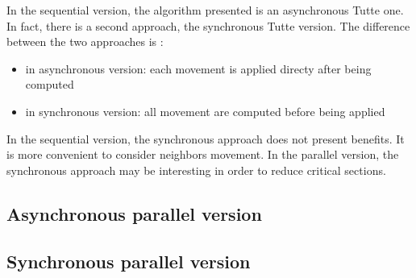

In the sequential version, the algorithm presented is an asynchronous Tutte one. In fact, there is a second approach, the synchronous Tutte version. The difference between the two approaches is :
\begin{itemize}
\item in asynchronous version: each movement is applied directy after being computed
\item in synchronous version: all movement are computed before being applied
\end{itemize}
In the sequential version, the synchronous approach does not present benefits. It is more convenient to consider neighbors movement.
In the parallel version, the synchronous approach may be interesting in order to reduce critical sections.

\subsection{Asynchronous parallel version}


\subsection{Synchronous parallel version}

